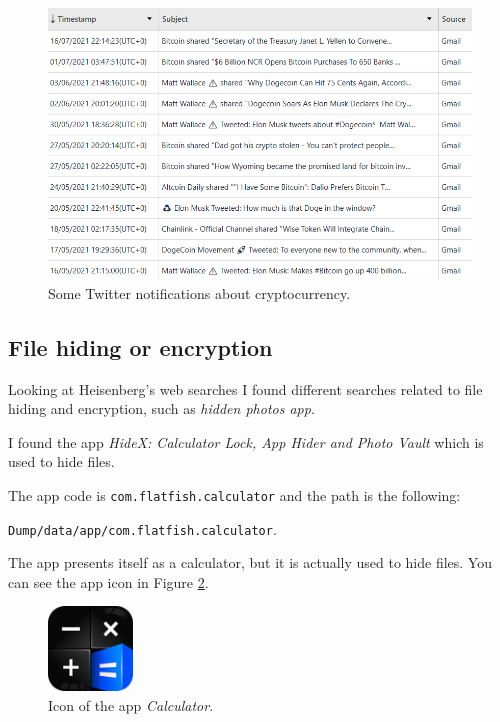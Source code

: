 \documentclass[12pt]{article}
\begin{document}
\begin{figure}[!ht]
    \centering
    \includegraphics[width=\textwidth]{images/gmail-crypto.png}
    \caption{Some Twitter notifications about cryptocurrency.}
    \label{fig:twitter}
\end{figure}

\subsection{File hiding or encryption}
\label{sec:file-hiding}

Looking at Heisenberg's web searches I found different searches related to file hiding and encryption, such as \textit{hidden photos app}.

I found the app \textit{HideX: Calculator Lock, App Hider and Photo Vault} \cite{calculator} which is used to hide files.

The app code is \texttt{com.flatfish.calculator} and the path is the following:

\texttt{Dump/data/app/com.flatfish.calculator}. 

The app presents itself as a calculator, but it is actually used to hide files. You can see the app icon in Figure \ref{fig:calc}.

\begin{figure}[!ht]
    \centering
    \includegraphics[width=0.2\textwidth]{images/icon.png}
    \caption{Icon of the app \textit{Calculator}.}
    \label{fig:calc}
\end{figure}
\end{document}
